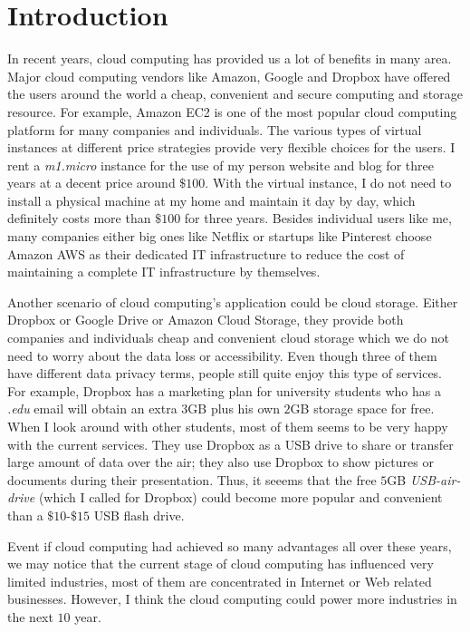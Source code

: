 \section{Introduction}
In recent years, cloud computing has provided us a lot of benefits in many area. Major cloud computing vendors like Amazon, Google and Dropbox have offered the users around the world a cheap, convenient and secure computing and storage resource. For example, Amazon EC2\cite{garfinkel2007evaluation} is one of the most popular cloud computing platform for many companies and individuals. The various types of virtual instances at different price strategies provide very flexible choices for the users. I rent a \emph{m1.micro} instance for the use of my person website and blog for three years at a decent price around $\$100$. With the virtual instance, I do not need to install a physical machine at my home and maintain it day by day, which definitely costs more than $\$100$ for three years. Besides individual users like me, many companies either big ones like Netflix or startups like Pinterest choose Amazon AWS as their dedicated IT infrastructure to reduce the cost of maintaining a complete IT infrastructure by themselves. 

Another scenario of cloud computing's application could be cloud storage. Either Dropbox or Google Drive or Amazon Cloud Storage, they provide both companies and individuals cheap and convenient cloud storage which we do not need to worry about the data loss or accessibility. Even though three of them have different data privacy terms, people still quite enjoy this type of services. For example, Dropbox has a marketing plan for university students who has a \emph{.edu} email will obtain an extra $3$GB plus his own $2$GB storage space for free. When I look around with other students, most of them seems to be very happy with the current services. They use Dropbox as a USB drive to share or transfer large amount of data over the air; they also use Dropbox to show pictures or documents during their presentation. Thus, it seeems that the free $5$GB \emph{USB-air-drive} (which I called for Dropbox) could become more popular and convenient than a $\$10$-$\$15$ USB flash drive.

Event if cloud computing had achieved so many advantages all over these years, we may notice that the current stage of cloud computing has influenced very limited industries, most of them are concentrated in Internet or Web related businesses. However, I think the cloud computing could power more industries in the next $10$ year.   

